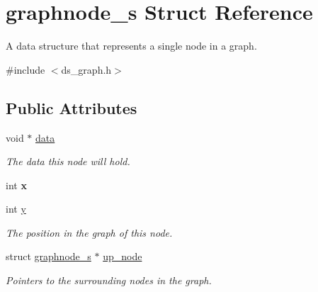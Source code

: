 \hypertarget{structgraphnode__s}{}\section{graphnode\+\_\+s Struct Reference}
\label{structgraphnode__s}


A data structure that represents a single node in a graph.  




{\ttfamily \#include $<$ds\+\_\+graph.\+h$>$}

\subsection*{Public Attributes}
\begin{DoxyCompactItemize}
\item 
\mbox{\label{structgraphnode__s_a33b281fd30a7f944f4ce7aa4bc123073}} 
void $\ast$ \hyperlink{structgraphnode__s_a33b281fd30a7f944f4ce7aa4bc123073}{data}
\begin{DoxyCompactList}\small\item\em The data this node will hold. \end{DoxyCompactList}\item 
\mbox{\label{structgraphnode__s_a02f0fb76d82673f04337748e060e200f}} 
int {\bfseries x}
\item 
\mbox{\label{structgraphnode__s_a91452c9d1ccdc620827f06aa8bba6e64}} 
int \hyperlink{structgraphnode__s_a91452c9d1ccdc620827f06aa8bba6e64}{y}
\begin{DoxyCompactList}\small\item\em The position in the graph of this node. \end{DoxyCompactList}\item 
\mbox{\label{structgraphnode__s_aef70ef9729aeeb3fa4e6af6bece8ece4}} 
struct \hyperlink{structgraphnode__s}{graphnode\+\_\+s} $\ast$ \hyperlink{structgraphnode__s_aef70ef9729aeeb3fa4e6af6bece8ece4}{up\+\_\+node}
\begin{DoxyCompactList}\small\item\em Pointers to the surrounding nodes in the graph. \end{DoxyCompactList}\item 
\mbox{\label{structgraphnode__s_a0f8cbc8a46d4a36c195698aeab489242}} 

\end{DoxyCompactItemize}
